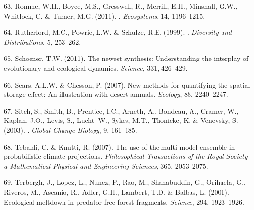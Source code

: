 \documentclass[11pt,a4paper,oneside]{article}
\begin{document}
\begin{thebibliography}{79}
63. Romme, W.H., Boyce, M.S., Gresswell, R., Merrill, E.H., Minshall, G.W.,
  Whitlock, C. \& Turner, M.G. (2011).
.
\newblock \emph{Ecosystems}, 14, 1196--1215.

64. Rutherford, M.C., Powrie, L.W. \& Schulze, R.E. (1999).
.
\newblock \emph{Diversity and Distributions}, 5, 253--262.

65. Schoener, T.W. ({2011}).
\newblock The newest synthesis: Understanding the interplay of evolutionary and
  ecological dynamics.
\newblock \emph{Science}, {331}, {426--429}.

66. Sears, A.L.W. \& Chesson, P. (2007).
\newblock New methods for quantifying the spatial storage effect: An
  illustration with desert annuals.
\newblock \emph{Ecology}, 88, 2240--2247.

67. Sitch, S., Smith, B., Prentice, I.C., Arneth, A., Bondeau, A., Cramer, W.,
  Kaplan, J.O., Levis, S., Lucht, W., Sykes, M.T., Thonicke, K. \& Venevsky, S.
  (2003).
.
\newblock \emph{Global Change Biology}, 9, 161--185.

68. Tebaldi, C. \& Knutti, R. (2007).
\newblock The use of the multi-model ensemble in probabilistic climate
  projections.
\newblock \emph{Philosophical Transactions of the Royal Society a-Mathematical
  Physical and Engineering Sciences}, 365, 2053--2075.

69. Terborgh, J., Lopez, L., Nunez, P., Rao, M., Shahabuddin, G., Orihuela, G.,
  Riveros, M., Ascanio, R., Adler, G.H., Lambert, T.D. \& Balbas, L. (2001).
\newblock Ecological meltdown in predator-free forest fragments.
\newblock \emph{Science}, 294, 1923--1926.


\end{thebibliography}
\end{document}
